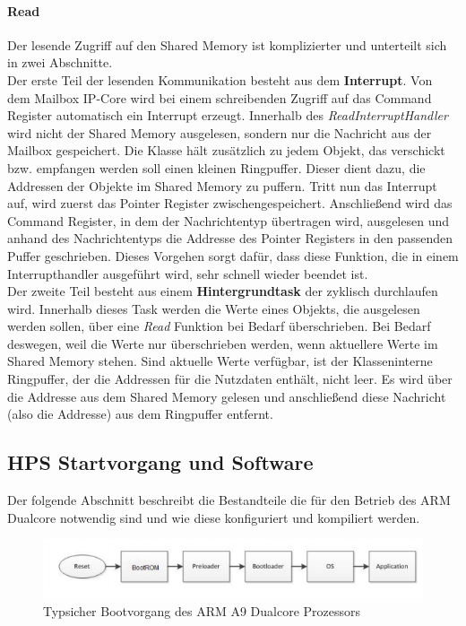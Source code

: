 \paragraph{Read}
Der lesende Zugriff auf den Shared Memory ist komplizierter und unterteilt sich in zwei Abschnitte.\\

Der erste Teil der lesenden Kommunikation besteht aus dem \textbf{Interrupt}. Von dem Mailbox \ac{IP}-Core wird bei einem schreibenden Zugriff auf das Command Register automatisch ein Interrupt erzeugt. Innerhalb des \textit{ReadInterruptHandler} wird nicht der Shared Memory ausgelesen, sondern nur die Nachricht aus der Mailbox gespeichert. Die Klasse hält zusätzlich zu jedem Objekt, das verschickt bzw. empfangen werden soll einen kleinen Ringpuffer. Dieser dient dazu, die Addressen der Objekte im Shared Memory zu puffern. Tritt nun das Interrupt auf, wird zuerst das Pointer Register zwischengespeichert. Anschließend wird das Command Register, in dem der Nachrichtentyp übertragen wird, ausgelesen und anhand des Nachrichtentyps die Addresse des Pointer Registers in den passenden Puffer geschrieben. Dieses Vorgehen sorgt dafür, dass diese Funktion, die in einem Interrupthandler ausgeführt wird, sehr schnell wieder beendet ist.\\

Der zweite Teil besteht aus einem \textbf{Hintergrundtask} der zyklisch durchlaufen wird. Innerhalb dieses Task werden die Werte eines Objekts, die ausgelesen werden sollen, über eine \textit{Read} Funktion bei Bedarf überschrieben. Bei Bedarf deswegen, weil die Werte nur überschrieben werden, wenn aktuellere Werte im Shared Memory stehen. Sind aktuelle Werte verfügbar, ist der Klasseninterne Ringpuffer, der die Addressen für die Nutzdaten enthält, nicht leer. Es wird über die Addresse aus dem Shared Memory gelesen und anschließend diese Nachricht (also die Addresse) aus dem Ringpuffer entfernt.

\subsection{\ac{HPS} Startvorgang und Software}
Der folgende Abschnitt beschreibt die Bestandteile die für den Betrieb des ARM Dualcore notwendig sind und wie diese konfiguriert und kompiliert werden.\\

\begin{figure}
	\includegraphics[width=\textwidth]{Abb/Booting.png}
	\caption{Typsicher Bootvorgang des ARM A9 Dualcore Prozessors \cite{arm_booting}}
	\label{Software:ArmBooting}
\end{figure}

